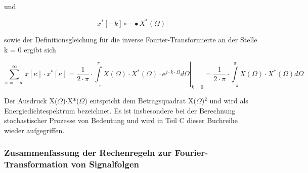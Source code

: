 \noindent und

\begin{equation}\label{eq:sevenseightynine}
x^{*} \left[-k\right]\circ -\bullet X^{*} \left(\Omega \right)
\end{equation}

\noindent sowie der Definitionsgleichung f\"{u}r die inverse Fourier-Transformierte an der Stelle k = 0 ergibt sich

\begin{equation}\label{eq:sevenninety}
\sum _{\kappa =-\infty}^{\infty}x\left[\kappa \right]\cdot x^{*} \left[\kappa \right] =\left. \frac{1}{2\cdot \pi} \cdot \int\limits _{-\pi}^{\pi}X\left(\Omega \right)\cdot X^{*} \left(\Omega \right)\cdot e^{j\cdot k\cdot \Omega}d\Omega \right|_{k=0} =\frac{1}{2\cdot \pi} \cdot \int\limits _{-\pi}^{\pi}X\left(\Omega \right)\cdot X^{*} \left(\Omega \right)d\Omega
\end{equation}

\noindent Der Ausdruck X($\Omega$)$\cdot$X*($\Omega$) entspricht dem Betragsquadrat {\textbar}X($\Omega$){\textbar}${}^{2}$ und wird als Energiedichtespektrum bezeichnet. Es ist insbesondere bei der Berechnung stochastischer Prozesse von Bedeutung und wird in Teil C dieser Buchreihe wieder aufgegriffen.

\subsubsection{Zusammenfassung der Rechenregeln zur Fourier-Transformation von Signalfolgen}

